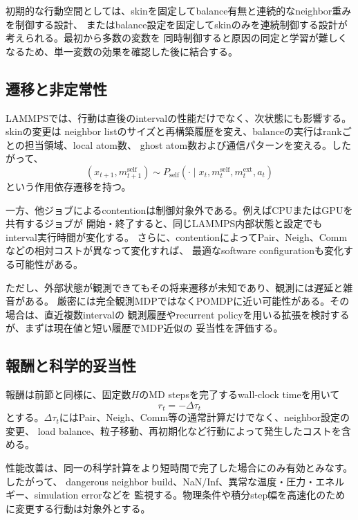 初期的な行動空間としては、skinを固定してbalance有無と連続的なneighbor重みを制御する設計、
またはbalance設定を固定してskinのみを連続制御する設計が考えられる。最初から多数の変数を
同時制御すると原因の同定と学習が難しくなるため、単一変数の効果を確認した後に結合する。

\subsection{遷移と非定常性}

LAMMPSでは、行動は直後のintervalの性能だけでなく、次状態にも影響する。skinの変更は
neighbor listのサイズと再構築履歴を変え、balanceの実行はrankごとの担当領域、local atom数、
ghost atom数および通信パターンを変える。したがって、
\begin{equation}
 (x_{t+1},m_{t+1}^{\mathrm{self}})
 \sim P_{\mathrm{self}}(\cdot\mid
 x_t,m_t^{\mathrm{self}},m_t^{\mathrm{ext}},a_t)
\end{equation}
という作用依存遷移を持つ。

一方、他ジョブによるcontentionは制御対象外である。例えばCPUまたはGPUを共有するジョブが
開始・終了すると、同じLAMMPS内部状態と設定でもinterval実行時間が変化する。
さらに、contentionによってPair、Neigh、Commなどの相対コストが異なって変化すれば、
最適なsoftware configurationも変化する可能性がある。

ただし、外部状態が観測できてもその将来遷移が未知であり、観測には遅延と雑音がある。
厳密には完全観測MDPではなくPOMDPに近い可能性がある。その場合は、直近複数intervalの
観測履歴やrecurrent policyを用いる拡張を検討するが、まずは現在値と短い履歴でMDP近似の
妥当性を評価する。

\subsection{報酬と科学的妥当性}

報酬は前節と同様に、固定数$H$のMD stepsを完了するwall-clock timeを用いて
\begin{equation}
 r_t=-\Delta\tau_t
\end{equation}
とする。$\Delta\tau_t$にはPair、Neigh、Comm等の通常計算だけでなく、neighbor設定の変更、
load balance、粒子移動、再初期化など行動によって発生したコストを含める。

性能改善は、同一の科学計算をより短時間で完了した場合にのみ有効とみなす。したがって、
dangerous neighbor build、NaN/Inf、異常な温度・圧力・エネルギー、simulation errorなどを
監視する。物理条件や積分step幅を高速化のために変更する行動は対象外とする。

